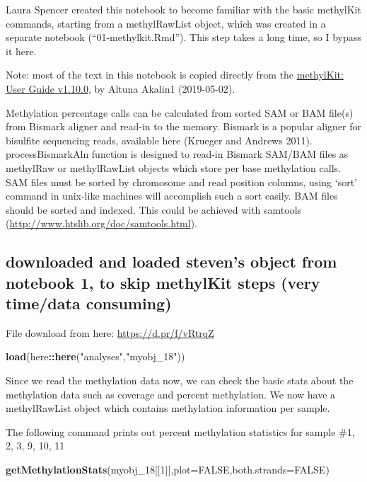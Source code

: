 \documentclass[]{article}
\newenvironment{Shaded}{\begin{snugshade}}{\end{snugshade}}
\newcommand{\KeywordTok}[1]{\textcolor[rgb]{0.13,0.29,0.53}{\textbf{#1}}}
\newcommand{\DataTypeTok}[1]{\textcolor[rgb]{0.13,0.29,0.53}{#1}}
\newcommand{\DecValTok}[1]{\textcolor[rgb]{0.00,0.00,0.81}{#1}}
\newcommand{\StringTok}[1]{\textcolor[rgb]{0.31,0.60,0.02}{#1}}
\newcommand{\OtherTok}[1]{\textcolor[rgb]{0.56,0.35,0.01}{#1}}
\newcommand{\OperatorTok}[1]{\textcolor[rgb]{0.81,0.36,0.00}{\textbf{#1}}}
\newcommand{\NormalTok}[1]{#1}
\begin{document}
Laura Spencer created this notebook to become familiar with the basic
methylKit commands, starting from a methylRawList object, which was
created in a separate notebook (``01-methylkit.Rmd''). This step takes a
long time, so I bypass it here.

Note: most of the text in this notebook is copied directly from the
\href{https://bioconductor.org/packages/release/bioc/vignettes/methylKit/inst/doc/methylKit.html}{methylKit:
User Guide v1.10.0}, by Altuna Akalin1 (2019-05-02).

Methylation percentage calls can be calculated from sorted SAM or BAM
file(s) from Bismark aligner and read-in to the memory. Bismark is a
popular aligner for bisulfite sequencing reads, available here (Krueger
and Andrews 2011). processBismarkAln function is designed to read-in
Bismark SAM/BAM files as methylRaw or methylRawList objects which store
per base methylation calls. SAM files must be sorted by chromosome and
read position columns, using `sort' command in unix-like machines will
accomplish such a sort easily. BAM files should be sorted and indexed.
This could be achieved with samtools
(\url{http://www.htslib.org/doc/samtools.html}).

\subsection{downloaded and loaded steven's object from notebook 1, to
skip methylKit steps (very time/data
consuming)}\label{downloaded-and-loaded-stevens-object-from-notebook-1-to-skip-methylkit-steps-very-timedata-consuming}

File download from here: \url{https://d.pr/f/vRtrqZ}

\begin{Shaded}
\begin{Highlighting}[]
\KeywordTok{load}\NormalTok{(here}\OperatorTok{::}\KeywordTok{here}\NormalTok{(}\StringTok{"analyses"}\NormalTok{,}\StringTok{"myobj_18"}\NormalTok{))}
\end{Highlighting}
\end{Shaded}

Since we read the methylation data now, we can check the basic stats
about the methylation data such as coverage and percent methylation. We
now have a methylRawList object which contains methylation information
per sample.

The following command prints out percent methylation statistics for
sample \#1, 2, 3, 9, 10, 11

\begin{Shaded}
\begin{Highlighting}[]
\KeywordTok{getMethylationStats}\NormalTok{(myobj_}\DecValTok{18}\NormalTok{[[}\DecValTok{1}\NormalTok{]],}\DataTypeTok{plot=}\OtherTok{FALSE}\NormalTok{,}\DataTypeTok{both.strands=}\OtherTok{FALSE}\NormalTok{)}
\end{Highlighting}
\end{Shaded}
\end{document}
